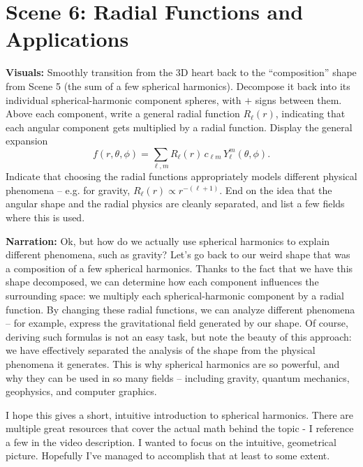 \documentclass[12pt]{article}
\begin{document}
\section*{Scene 6: Radial Functions and Applications}
\textbf{Visuals:}
Smoothly transition from the 3D heart back to the ``composition'' shape from Scene 5 (the sum of a few spherical harmonics). Decompose it back into its individual spherical-harmonic component spheres, with $+$ signs between them. Above each component, write a general radial function $R_\ell(r)$, indicating that each angular component gets multiplied by a radial function. Display the general expansion
$$ f(r,\theta,\phi) = \sum_{\ell,m} R_\ell(r)\, c_{\ell m}\, Y_\ell^m(\theta,\phi). $$
Indicate that choosing the radial functions appropriately models different physical phenomena -- e.g. for gravity, $R_\ell(r) \propto r^{-(\ell+1)}$. End on the idea that the angular shape and the radial physics are cleanly separated, and list a few fields where this is used.

\textbf{Narration:}
Ok, but how do we actually use spherical harmonics to explain different phenomena, such as gravity? Let's go back to our weird shape that was a composition of a few spherical harmonics. Thanks to the fact that we have this shape decomposed, we can determine how each component influences the surrounding space: we multiply each spherical-harmonic component by a radial function. By changing these radial functions, we can analyze different phenomena -- for example, express the gravitational field generated by our shape. Of course, deriving such formulas is not an easy task, but note the beauty of this approach: we have effectively separated the analysis of the shape from the physical phenomena it generates. This is why spherical harmonics are so powerful, and why they can be used in so many fields -- including gravity, quantum mechanics, geophysics, and computer graphics.

I hope this gives a short, intuitive introduction to spherical harmonics. There are multiple great resources that cover the actual math behind the topic - I reference a few in the video description. I wanted to focus on the intuitive, geometrical picture. Hopefully I've managed to accomplish that at least to some extent.
\end{document}
